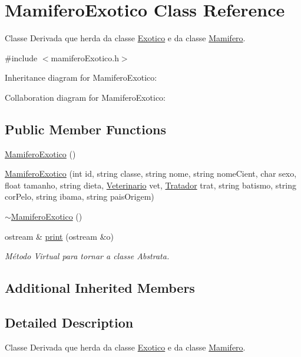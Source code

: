 \hypertarget{classMamiferoExotico}{}\section{Mamifero\+Exotico Class Reference}
\label{classMamiferoExotico}


Classe Derivada que herda da classe \hyperlink{classExotico}{Exotico} e da classe \hyperlink{classMamifero}{Mamifero}.  




{\ttfamily \#include $<$mamifero\+Exotico.\+h$>$}



Inheritance diagram for Mamifero\+Exotico\+:


Collaboration diagram for Mamifero\+Exotico\+:
\subsection*{Public Member Functions}
\begin{DoxyCompactItemize}
\item 
\hyperlink{classMamiferoExotico_a7dda2506d9e38c14b6d85fa666344ed6}{Mamifero\+Exotico} ()
\item 
\hyperlink{classMamiferoExotico_ab1450ee69c95075d28689b39e2fc822b}{Mamifero\+Exotico} (int id, string classe, string nome, string nome\+Cient, char sexo, float tamanho, string dieta, \hyperlink{classVeterinario}{Veterinario} vet, \hyperlink{classTratador}{Tratador} trat, string batismo, string cor\+Pelo, string ibama, string pais\+Origem)
\item 
\hyperlink{classMamiferoExotico_a2ab6c04adde874cc40aa55b5f586c15a}{$\sim$\+Mamifero\+Exotico} ()
\item 
ostream \& \hyperlink{classMamiferoExotico_a465d48bc4a1111059ec38a04f76b264e}{print} (ostream \&o)
\begin{DoxyCompactList}\small\item\em Método Virtual para tornar a classe Abstrata. \end{DoxyCompactList}\end{DoxyCompactItemize}
\subsection*{Additional Inherited Members}


\subsection{Detailed Description}
Classe Derivada que herda da classe \hyperlink{classExotico}{Exotico} e da classe \hyperlink{classMamifero}{Mamifero}. 

